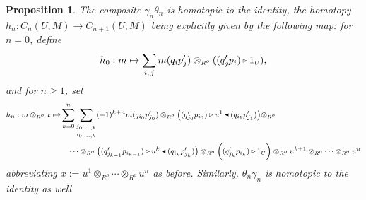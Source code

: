 \documentclass[reqno, a4paper, 10pt]{amsart}
\numberwithin{equation}{section}
\theoremstyle{plain}
\newtheorem{proposition}[theorem]{Proposition}
\theoremstyle{definition}
\theoremstyle{remark}
\begin{document}
\begin{proposition}\label{prop: h}
The composite $\gamma_n \theta_n$ is homotopic to the identity, the homotopy $h_n: C_n(U, M) \to C_{n+1}(U,M)$ 
being explicitly given by the following map: for $n=0$, define  
$$
h_0: m \mapsto \sum_{i,\,j} m(q_ip'_j) \otimes_{{\scriptscriptstyle{{R^{o}}}}} ((q'_jp_i) {{\,\raise1pt\hbox{$\scriptscriptstyle{\rhd}$} \, }} 1_{{\scriptscriptstyle{U}}}),
$$
and for $n\geq 1$, set
\begin{equation}\label{reyescattolicos}
\begin{footnotesize}
{
\begin{split}
h_n: m \otimes_{{\scriptscriptstyle{{R^{o}}}}} x \mapsto 
& \sum^n_{k=0}  \underset{\underset{i_{0, \ldots, k}}{j_{0,\ldots, k}}}{\sum}  (-1)^{k+n} m(q_{i_0}p'_{j_0}) 
\otimes_{{\scriptscriptstyle{{R^{o}}}}} {\big( { (q'_{j_0}p_{i_0}) {{\,\raise1pt\hbox{$\scriptscriptstyle{\rhd}$} \, }} u^1 {{\,\raise1pt\hbox{$\scriptscriptstyle{\blacktriangleleft}$} \, }} (q_{i_1}p'_{j_1}) } \big)}
\otimes_{{\scriptscriptstyle{{R^{o}}}}}  \\
& \quad \cdots  \otimes_{{\scriptscriptstyle{{R^{o}}}}}{\big( { (q'_{j_{k-1}}p_{i_{k-1}}) {{\,\raise1pt\hbox{$\scriptscriptstyle{\rhd}$} \, }} u^k {{\,\raise1pt\hbox{$\scriptscriptstyle{\blacktriangleleft}$} \, }}   (q_{i_k}p'_{j_k}) } \big)}   \otimes_{{\scriptscriptstyle{{R^{o}}}}}  \Big( (q'_{j_k}p_{i_k})  {{\,\raise1pt\hbox{$\scriptscriptstyle{\rhd}$} \, }} 1_{{\scriptscriptstyle{U}}} \Big) \otimes_{{\scriptscriptstyle{{R^{o}}}}} u^{k+1} \otimes_{{\scriptscriptstyle{{R^{o}}}}} \cdots \otimes_{{\scriptscriptstyle{{R^{o}}}}} u^n 
\end{split} }
\end{footnotesize}
\end{equation}
abbreviating $x:=u^1 \otimes_{{\scriptscriptstyle{{R^{o}}}}} \cdots \otimes_{{\scriptscriptstyle{{R^{o}}}}} u^n$ as before. 
Similarly, $\theta_n \gamma_n$ is homotopic to the identity as well.
\end{proposition}
\end{document}
